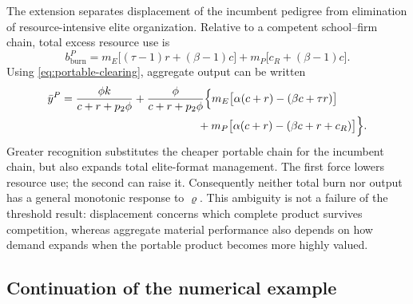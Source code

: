 \documentclass[12pt,letterpaper]{article}
\theoremstyle{definition}
\begin{document}
The extension separates displacement of the incumbent pedigree from elimination of
resource-intensive elite organization.
Relative to a competent school--firm chain, total excess resource use is
\begin{equation}\label{eq:portable-burn}
  b_{\mathrm{burn}}^P
  =
  m_E\big[(\tau-1)r+(\beta-1)c\big]
  +
  m_P\big[c_R+(\beta-1)c\big].
\end{equation}
Using \eqref{eq:portable-clearing}, aggregate output can be written
\begin{align}
\bar y^P
&=
\frac{\phi k}{c+r+p_2\phi}
+
\frac{\phi}{c+r+p_2\phi}
\Big\{
  m_E\big[\alpha(c+r)-(\beta c+\tau r)\big] \notag\\
&\hspace{43mm}
  +m_P\big[\alpha(c+r)-(\beta c+r+c_R)\big]
\Big\}.
\label{eq:portable-output}
\end{align}
Greater recognition substitutes the cheaper portable chain for the incumbent chain, but
also expands total elite-format management.
The first force lowers resource use; the second can raise it.
Consequently neither total burn nor output has a general monotonic response to
$\varrho$.
This ambiguity is not a failure of the threshold result: displacement concerns which
complete product survives competition, whereas aggregate material performance also
depends on how demand expands when the portable product becomes more highly valued.

\subsection{Continuation of the numerical example}
\end{document}
